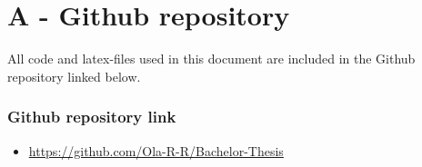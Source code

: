 
\chapter*{A - Github repository}

\noindent All code and latex-files used in this document are included in the Github repository linked below.

\subsection*{Github repository link}
\begin{itemize}
    \item \url{https://github.com/Ola-R-R/Bachelor-Thesis}
\end{itemize}